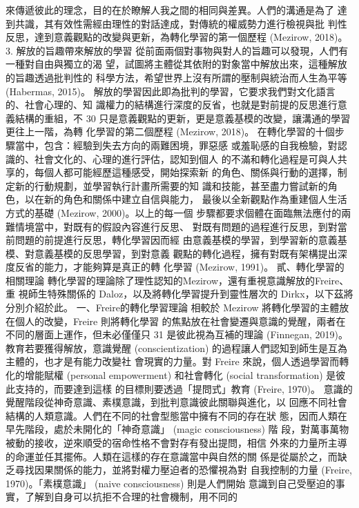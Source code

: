 來傳遞彼此的理念，目的在於瞭解人我之間的相同與差異。人們的溝通是為了
達到共識，其有效性需經由理性的對話達成，對傳統的權威勢力進行檢視與批
判性反思，達到意義觀點的改變與更新，為轉化學習的第一個歷程 (Mezirow, 
2018)。 
3. 解放的旨趣帶來解放的學習 
從前面兩個對事物與對人的旨趣可以發現，人們有一種對自由與獨立的渴
望，試圖將主體從其依附的對象當中解放出來，這種解放的旨趣透過批判性的
科學方法，希望世界上沒有所謂的壓制與統治而人生為平等 (Habermas, 2015)。
解放的學習因此即為批判的學習，它要求我們對文化語言的、社會心理的、知
識權力的結構進行深度的反省，也就是對前提的反思進行意義結構的重組，不
30 
只是意義觀點的更新，更是意義基模的改變，讓溝通的學習更往上一階，為轉
化學習的第二個歷程 (Mezirow, 2018)。 
在轉化學習的十個步驟當中，包含：經驗到失去方向的兩難困境，罪惡感
或羞恥感的自我檢驗，對認識的、社會文化的、心理的進行評估，認知到個人
的不滿和轉化過程是可與人共享的，每個人都可能經歷這種感受，開始探索新
的角色、關係與行動的選擇，制定新的行動規劃，並學習執行計畫所需要的知
識和技能，甚至盡力嘗試新的角色，以在新的角色和關係中建立自信與能力，
最後以全新觀點作為重建個人生活方式的基礎 (Mezirow, 2000)。以上的每一個
步驟都要求個體在面臨無法應付的兩難情境當中，對既有的假設內容進行反思、
對既有問題的過程進行反思，到對當前問題的前提進行反思，轉化學習因而經
由意義基模的學習，到學習新的意義基模、對意義基模的反思學習，到對意義
觀點的轉化過程，擁有對既有架構提出深度反省的能力，才能夠算是真正的轉
化學習 (Mezirow, 1991)。 
貳、轉化學習的相關理論 
轉化學習的理論除了理性認知的Mezirow，還有重視意識解放的Freire、重
視師生特殊關係的 Daloz，以及將轉化學習提升到靈性層次的 Dirkx，以下茲將
分別介紹於此。 
一、Freire的轉化學習理論 
相較於 Mezirow 將轉化學習的主體放在個人的改變，Freire 則將轉化學習
的焦點放在社會變遷與意識的覺醒，兩者在不同的層面上運作，但未必僅僅只
31 
是彼此視為互補的理論 (Finnegan, 2019)。教育若要獲得解放，意識覺醒 
(conscientization) 的過程讓人們認知到師生是互為主體的，也才是有能力改變社
會現實的力量。對 Freire 來說，個人透過學習而轉化的增能賦權 (personal 
empowerment) 和社會轉化 (social transformation) 是彼此支持的，而要達到這樣
的目標則要透過「提問式」教育 (Freire, 1970)。 
意識的覺醒階段從神奇意識、素樸意識，到批判意識彼此關聯與進化，以
回應不同社會結構的人類意識。人們在不同的社會型態當中擁有不同的存在狀
態，因而人類在早先階段，處於未開化的「神奇意識」 (magic consciousness) 階
段，對萬事萬物被動的接收，逆來順受的宿命性格不會對存有發出提問，相信
外來的力量所主導的命運並任其擺佈。人類在這樣的存在意識當中與自然的關
係是從屬於之，而缺乏尋找因果關係的能力，並將對權力壓迫者的恐懼視為對
自我控制的力量 (Freire, 1970)。「素樸意識」 (naive consciousness) 則是人們開始
意識到自己受壓迫的事實，了解到自身可以抗拒不合理的社會機制，用不同的
